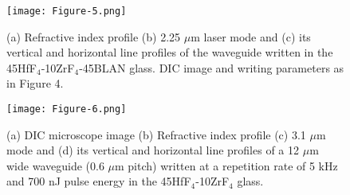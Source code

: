 \documentclass[11pt]{article}
\begin{document}
\begin{figure}[ht]
\centering
\texttt{[image: Figure-5.png]}\caption{(a) Refractive index profile (b) 2.25 $\mu$m laser mode and (c) its vertical and horizontal line profiles of the waveguide written in the 45HfF$_4$-10ZrF$_4$-45BLAN glass. DIC image and writing parameters as in Figure 4.}
\label{2.25mode}
\end{figure}

\begin{figure}[ht]
\centering
\texttt{[image: Figure-6.png]}\caption{(a) DIC microscope image (b) Refractive index profile (c) 3.1 $\mu$m mode and (d) its vertical and horizontal line profiles of a 12 $\mu$m wide waveguide (0.6 $\mu$m pitch) written at a repetition rate of 5 kHz and 700 nJ pulse energy in the 45HfF$_4$-10ZrF$_4$ glass. }
\label{3.1mode}
\end{figure}
\end{document}
